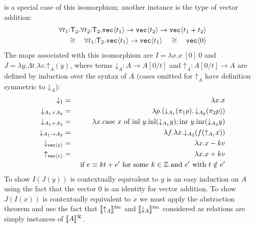  is a special case of this isomorphism; another instance is the
type of vector addition:
\begin{eqnarray*}
\forall t_1\mathord:\mathsf{T}_2.\forall t_2\mathord:\mathsf{T}_2.\textup{\texttt{vec}}\langle t_1 \rangle\to\textup{\texttt{vec}}\langle t_2 \rangle\to\textup{\texttt{vec}}\langle t_1+t_2 \rangle\\
\cong\quad
\forall t_1\mathord:\mathsf{T}_2.\textup{\texttt{vec}}\langle t_1 \rangle\to\textup{\texttt{vec}}\langle t_1 \rangle\quad\cong\quad
\textup{\texttt{vec}}\langle 0 \rangle
\end{eqnarray*}
\noindent
\newcommand{\transup}[1]{\mathord\uparrow_{#1}}
\newcommand{\transdn}[1]{\mathord\downarrow_{#1}}
The maps associated with this isomorphism are 
$I = \lambda x. x\ [0]\ 0$ and $J = \lambda y. \Lambda t.\lambda v. \transup A (y)$,
where terms $\transdn A : A\to A[0/t]$ and $\transup A : A[0/t] \to A$ are defined by induction over the syntax of $A$ (cases omitted for $\transup A$ have definition symmetric to $\transdn A$):
\begin{eqnarray*}
\transdn{1} & = & \lambda x. x\\ 
\transdn{A_1\times A_2} & = & \lambda p. (\transdn{A_1}(\pi_1 p),\transdn{A_2}(\pi_2 p))\\ 
\transdn{A_1 + A_2} & = & \lambda x.
\textrm{case}\ x\ \textrm{of}\ \textrm{inl}\ y.\textrm{inl}(\transdn{A_1}y); \textrm{inr}\ y.\textrm{inr}(\transdn{A_2}y)\\ 
\transdn{A_1\to A_2} & = & \lambda f. \lambda x. \transdn{A_2} (f(\transup{A_1}x))\\ 
\transdn{\tyPrim{vec}{e}} & = & \lambda x. x - kv\\ 
\transup{\tyPrim{vec}{e}} & = & \lambda x. x + kv\\ & & \text{ if }e \equiv k t + e'\text{ for
  some }k\in\setOfIntegers \text{ and }e'\text{ with }t\notin e'
\end{eqnarray*}
To show $I(J(y))$ is contextually equivalent to $y$ is an easy
induction on $A$ using the fact that the vector $0$
is an identity for vector addition. To show $J(I(x))$ is contextually
equivalent to $x$ we must apply the abstraction theorem and use
the fact that $\tmSem{\transup A}$ and $\tmSem{\transdn A}$ 
considered as relations are simply instances of $\llbracket A \rrbracket^{\mathcal{R}}_{}{}$.

